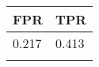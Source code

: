 \begin{tabular}{ll}
\hline
 FPR   & TPR   \\
\hline
 0.217 & 0.413 \\
       &       \\
\hline
\end{tabular}
